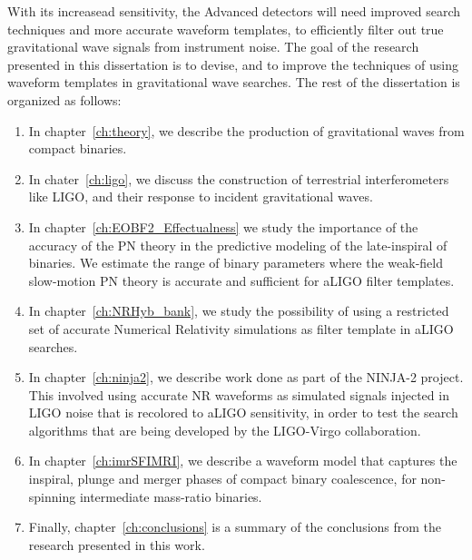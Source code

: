With its increasead sensitivity, the Advanced detectors will need improved
search techniques and more accurate waveform templates, to efficiently
filter out true gravitational wave signals from instrument noise. 
The goal of the research presented in this dissertation is to devise, and to
improve the techniques of using waveform templates in gravitational wave searches. 
The rest of the dissertation is organized as follows:
\begin{enumerate}
 \item In chapter~\ref{ch:theory}, we describe the production of gravitational
 waves from compact binaries. %
 \item In chater~\ref{ch:ligo}, we discuss the construction of terrestrial 
 interferometers like LIGO, and their response to incident gravitational waves.
 \item In chapter~\ref{ch:EOBF2_Effectualness} 
 we study the importance of the accuracy of the PN theory in the predictive 
 modeling of the late-inspiral of binaries. We estimate the range of binary 
 parameters where the weak-field slow-motion PN theory is accurate and 
 sufficient for aLIGO filter templates.
 \item In chapter~\ref{ch:NRHyb_bank}, we study the possibility of using a
 restricted set of accurate Numerical Relativity simulations as filter template
 in aLIGO searches. 
 \item In chapter~\ref{ch:ninja2}, we describe work done as part of the 
 NINJA-2 project. This involved using accurate NR waveforms as simulated
 signals injected in LIGO noise that is recolored to aLIGO sensitivity, in
 order to test the search algorithms that are being developed by the
 LIGO-Virgo collaboration.
 \item In chapter~\ref{ch:imrSFIMRI}, we describe a waveform model that 
 captures the inspiral, plunge and merger phases of compact binary 
 coalescence, for non-spinning intermediate mass-ratio binaries.
 \item Finally, chapter~\ref{ch:conclusions} is a summary of the conclusions
 from the research presented in this work.
\end{enumerate}




